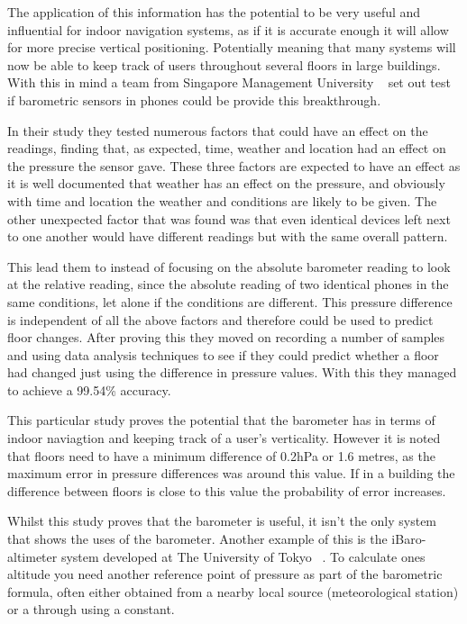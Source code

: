 \documentclass[main.tex]{subfiles}
\begin{document}
The application of this information has the potential to be very useful and influential for indoor navigation systems, as if it is accurate enough it will allow for more precise vertical positioning. Potentially meaning that many systems will now be able to keep track of users throughout several floors in large buildings. With this in mind a team from Singapore Management University ~\cite{baro2014} set out test if barometric sensors in phones could be provide this breakthrough.

In their study they tested numerous factors that could have an effect on the readings, finding that, as expected, time, weather and location had an effect on the pressure the sensor gave. These three factors are expected to have an effect as it is well documented that weather has an effect on the pressure, and obviously with time and location the weather and conditions are likely to be given. The other unexpected factor that was found was that even identical devices left next to one another would have different readings but with the same overall pattern. ~\cite[p.2]{baro2014}

This lead them to instead of focusing on the absolute barometer reading to look at the relative reading, since the absolute reading of two identical phones in the same conditions, let alone if the conditions are different. This pressure difference is independent of all the above factors and therefore could be used to predict floor changes. After proving this they moved on recording a number of samples and using data analysis techniques to see if they could predict whether a floor had changed just using the difference in pressure values. With this they managed to achieve a 99.54\% accuracy.

This particular study proves the potential that the barometer has in terms of indoor naviagtion and keeping track of a user's verticality. However it is noted that floors need to have a minimum difference of 0.2hPa or 1.6 metres, as the maximum error in pressure differences was around this value. If in a building the difference between floors is close to this value the probability of error increases.

Whilst this study proves that the barometer is useful, it isn't the only system that shows the uses of the barometer. Another example of this is the iBaro-altimeter system developed at The University of Tokyo ~\cite{baro22014}. To calculate ones altitude you need another reference point of pressure as part of the barometric formula, often either obtained from a nearby local source (meteorological station) or a through using a constant.
\end{document}
